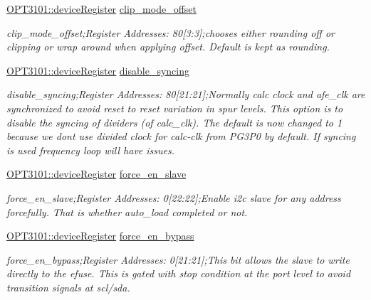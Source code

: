 \begin{DoxyCompactItemize}
\mbox{\hyperlink{class_o_p_t3101_1_1device_register}{O\+P\+T3101\+::device\+Register}} \mbox{\hyperlink{class_o_p_t3101_1_1registers_ae4e6e6a2afdbe9aa78d7bef9f0937eb7}{clip\+\_\+mode\+\_\+offset}}
\begin{DoxyCompactList}\small\item\em clip\+\_\+mode\+\_\+offset;Register Addresses\+: 80\mbox{[}3\+:3\mbox{]};chooses either rounding off or clipping or wrap around when applying offset. Default is kept as rounding. \end{DoxyCompactList}\item 
\mbox{\hyperlink{class_o_p_t3101_1_1device_register}{O\+P\+T3101\+::device\+Register}} \mbox{\hyperlink{class_o_p_t3101_1_1registers_ab57b1df98f5f15dd8027331041bfcfa3}{disable\+\_\+syncing}}
\begin{DoxyCompactList}\small\item\em disable\+\_\+syncing;Register Addresses\+: 80\mbox{[}21\+:21\mbox{]};Normally calc clock and afe\+\_\+clk are synchronized to avoid reset to reset variation in spur levels. This option is to disable the syncing of dividers (of calc\+\_\+clk). The default is now changed to \textquotesingle{}1\textquotesingle{} because we don\textquotesingle{}t use divided clock for calc-\/clk from P\+G3\+P0 by default. If syncing is used frequency loop will have issues. \end{DoxyCompactList}\item 
\mbox{\hyperlink{class_o_p_t3101_1_1device_register}{O\+P\+T3101\+::device\+Register}} \mbox{\hyperlink{class_o_p_t3101_1_1registers_a41a1c843f871b218c7ead6c8b4a4aca6}{force\+\_\+en\+\_\+slave}}
\begin{DoxyCompactList}\small\item\em force\+\_\+en\+\_\+slave;Register Addresses\+: 0\mbox{[}22\+:22\mbox{]};Enable i2c slave for any address forcefully. That is whether auto\+\_\+load completed or not. \end{DoxyCompactList}\item 
\mbox{\hyperlink{class_o_p_t3101_1_1device_register}{O\+P\+T3101\+::device\+Register}} \mbox{\hyperlink{class_o_p_t3101_1_1registers_a8ce40d49958ba30cfd4f7072624072e4}{force\+\_\+en\+\_\+bypass}}
\begin{DoxyCompactList}\small\item\em force\+\_\+en\+\_\+bypass;Register Addresses\+: 0\mbox{[}21\+:21\mbox{]};This bit allows the slave to write directly to the efuse. This is gated with stop condition at the port level to avoid transition signals at scl/sda. \end{DoxyCompactList}\item 

\end{DoxyCompactItemize}
